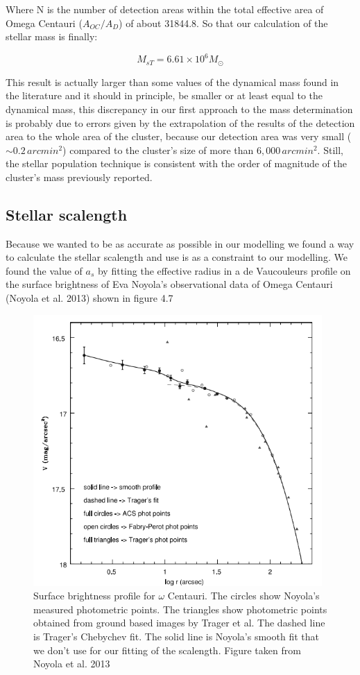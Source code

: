 Where N is the number of detection areas within the total effective area of Omega Centauri ($A_{OC}/A_{D}$) of about 31844.8. So that our calculation of the stellar mass is finally:

\begin{equation}
M_{s T} = 6.61 \times 10^{6}M_{\odot}
\end{equation}
 
This result is actually larger than some values  of the dynamical mass found in the literature and it should in principle, be smaller or at least equal to the dynamical mass, this discrepancy in our first approach to the mass determination is probably due to errors given by the extrapolation of the results of the detection area to the whole area of the cluster, because our detection area was very small ($\sim 0.2 \, arcmin^{2}$) compared to the cluster's size of more than $6,000 \, arcmin^{2}$. Still, the stellar population technique is consistent with the order of magnitude of the cluster's mass previously reported. 

\subsection{Stellar scalength}

Because we wanted to be as accurate as possible in our modelling we found a way to calculate the stellar scalength and use is as a constraint to our modelling. We found the value of $a_{s}$ by fitting the effective radius in a de Vaucouleurs profile on the surface brightness of Eva Noyola's observational data of Omega Centauri (Noyola et al. 2013) shown in figure 4.7

\begin{figure}[H]
\centering
\includegraphics[width=11cm]{images/noyola.png}
\caption[Surface brightness profile of Omega Centauri]{Surface brightness profile for $\omega$ Centauri. The circles show Noyola's measured photometric points. The triangles show photometric points obtained from ground based images by Trager et al. The dashed line is Trager’s Chebychev fit. The solid line is Noyola's smooth fit that we don't use for our fitting of the scalength. Figure taken from Noyola et al. 2013}
\end{figure}

